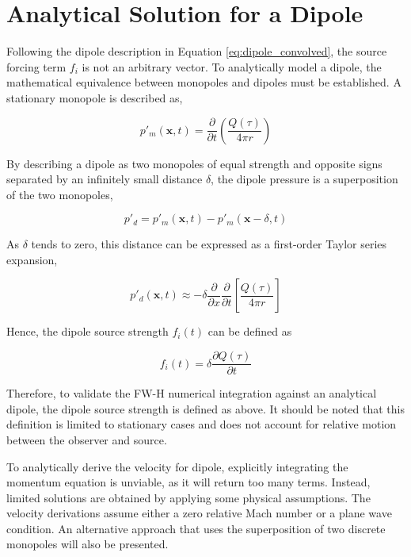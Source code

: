 \section{Analytical Solution for a Dipole} \label{subsec:dipole_derivation}

Following the dipole description in Equation \ref{eq:dipole_convolved}, the source forcing term $f_i$ is not an arbitrary vector. To analytically model a dipole, the mathematical equivalence between monopoles and dipoles must be established. A stationary monopole is described as,

\begin{equation*}
    p'_m(\bm{x}, t) = \frac{\partial}{\partial t} \left( \frac{Q(\tau)}{4\pi r} \right)
\end{equation*}

By describing a dipole as two monopoles of equal strength and opposite signs separated by an infinitely small distance $\delta$, the dipole pressure is a superposition of the two monopoles,

\begin{equation*}
    p'_d=p'_m(\bm{x},t)-p'_m(\bm{x}-\delta, t)
\end{equation*}

As $\delta$ tends to zero, this distance can be expressed as a first-order Taylor series expansion,

\begin{equation*}
    p'_d(\bm{x},t) \approx -\delta \frac{\partial}{\partial x} \frac{\partial}{\partial t} \left[ \frac{Q(\tau)}{4\pi r} 
    \right] 
\end{equation*}

Hence, the dipole source strength $f_i(t)$ can be defined as

\begin{equation}
    f_i(t)=\delta \frac{\partial Q(\tau)}{\partial t}
    \label{eq:dipole_source}
\end{equation}

Therefore, to validate the FW-H numerical integration against an analytical dipole, the dipole source strength is defined as above. It should be noted that this definition is limited to stationary cases and does not account for relative motion between the observer and source.

To analytically derive the velocity for dipole, explicitly integrating the momentum equation is unviable, as it will return too many terms. Instead, limited solutions are obtained by applying some physical assumptions. The velocity derivations assume either a zero relative Mach number or a plane wave condition. An alternative approach that uses the superposition of two discrete monopoles will also be presented.

